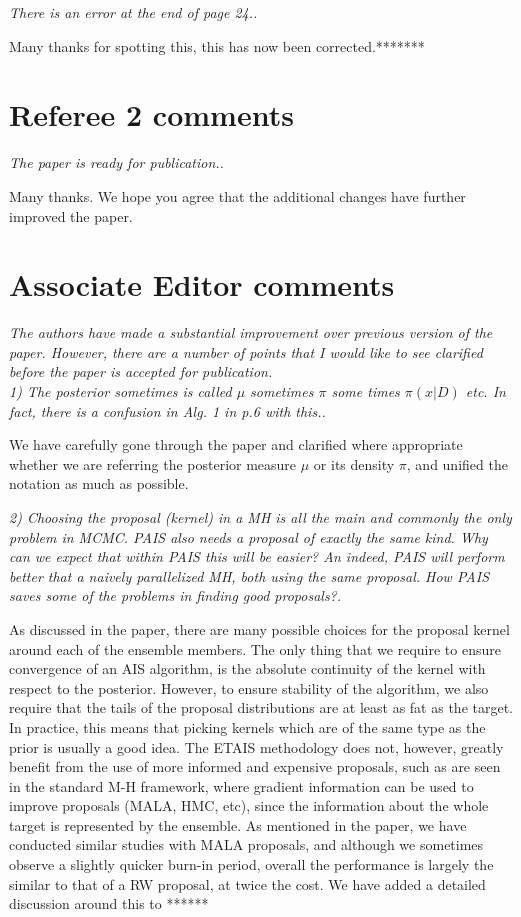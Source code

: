 \documentclass{article}
\newcommand{\comment}[2]{\vspace{0.6cm}{\bf Comment:} {\it #1.}

\vspace{0.3cm}{\bf Answer:} #2}
\begin{document}
\comment{There is an error at the end of page 24.}{Many thanks for spotting this, this has now been corrected.*******}

\section*{Referee 2 comments}
\comment{The paper is ready for publication.}{Many thanks. We hope you agree that the additional changes have further improved the paper.}

\section*{Associate Editor comments}

\comment{The authors have made a substantial improvement over previous version of the paper. However, there are a number of points that I would like to see clarified before the paper is accepted for publication.\\
1) The posterior sometimes is called $\mu$ sometimes $\pi$ some times $\pi(x|D)$ etc. In fact, there is a confusion in Alg. 1 in p.6 with this.}{We have carefully gone through the paper and clarified where appropriate whether we are referring the posterior measure $\mu$ or its density $\pi$, and unified the notation as much as possible.}

\comment{2) Choosing the proposal (kernel) in a MH is all the main and commonly the only problem in MCMC. PAIS also needs a proposal of exactly the same kind. Why can we expect that within PAIS this will be easier? An indeed, PAIS will perform better that a naively parallelized MH, both using the same proposal. How PAIS saves some of the problems in finding good proposals?}{As discussed in the paper, there are many possible choices for the proposal kernel around each of the ensemble members. The only thing that we require to ensure convergence of an AIS algorithm, is the absolute continuity of the kernel with respect to the posterior. However, to ensure stability of the algorithm, we also require that the tails of the proposal distributions are at least as fat as the target. In practice, this means that picking kernels which are of the same type as the prior is usually a good idea. The ETAIS methodology does not, however, greatly benefit from the use of more informed and expensive proposals, such as are seen in the standard M-H framework, where gradient information can be used to improve proposals (MALA, HMC, etc), since the information about the whole target is represented by the ensemble. As mentioned in the paper, we have conducted similar studies with MALA proposals, and although we sometimes observe a slightly quicker burn-in period, overall the performance is largely the similar to that of a RW proposal, at twice the cost. We have added a detailed discussion around this to ******}
\end{document}
